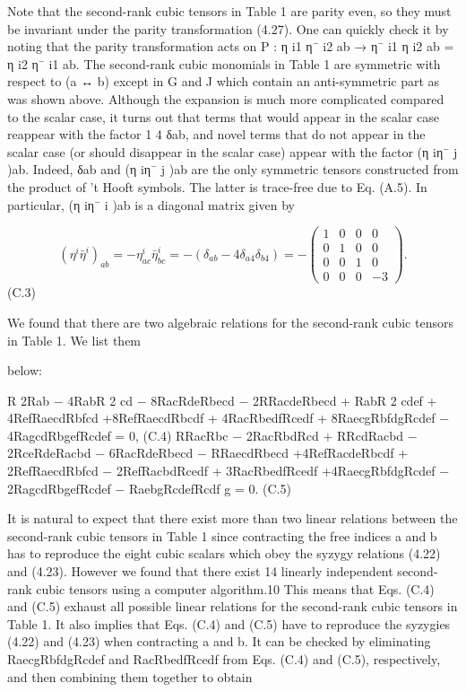 \documentclass{article}
\begin{document}
Note that the second-rank cubic tensors in Table 1 are parity even, so they must be invariant under the parity transformation (4.27). One can quickly check it by noting that the parity transformation acts on P : η i1 η¯ i2 ab → η¯ i1 η i2 ab = η i2 η¯ i1 ab. The second-rank cubic monomials in Table 1 are symmetric with respect to (a ↔ b) except in G and J which contain an anti-symmetric part as was shown above. Although the expansion is much more complicated compared to the scalar case, it turns out that terms that would appear in the scalar case reappear with the factor 1 4 δab, and novel terms that do not appear in the scalar case (or should disappear in the scalar case) appear with the factor (η iη¯ j )ab. Indeed, δab and (η iη¯ j )ab are the only symmetric tensors constructed from the product of 't Hooft symbols. The latter is trace-free due to Eq. (A.5). In particular, (η iη¯ i )ab is a diagonal matrix given by

$$(\eta^{i}\bar{\eta}^{i})_{ab}=-\eta^{i}_{ac}\bar{\eta}^{i}_{bc}=-\left(\delta_{ab}-4\delta_{a4}\delta_{b4}\right)=-\left(\begin{array}{cccc}1&0&0&0\\ 0&1&0&0\\ 0&0&1&0\\ 0&0&0&-3\end{array}\right).$$ (C.3)

We found that there are two algebraic relations for the second-rank cubic tensors in Table 1. We list them

below:

R 2Rab − 4RabR 2 cd − 8RacRdeRbecd − 2RRacdeRbecd + RabR 2 cdef + 4RefRaecdRbfcd +8RefRaecdRbcdf + 4RacRbedfRcedf + 8RaecgRbfdgRcdef − 4RagcdRbgefRcdef = 0, (C.4) RRacRbc − 2RacRbdRcd + RRcdRacbd − 2RceRdeRacbd − 6RacRdeRbecd − RRaecdRbecd +4RefRacdeRbcdf + 2RefRaecdRbfcd − 2RefRacbdRcedf + 3RacRbedfRcedf +4RaecgRbfdgRcdef − 2RagcdRbgefRcdef − RaebgRcdefRcdf g = 0. (C.5)

It is natural to expect that there exist more than two linear relations between the second-rank cubic tensors in Table 1 since contracting the free indices a and b has to reproduce the eight cubic scalars which obey the syzygy relations (4.22) and (4.23). However we found that there exist 14 linearly independent second-rank cubic tensors using a computer algorithm.10 This means that Eqs. (C.4) and (C.5) exhaust all possible linear relations for the second-rank cubic tensors in Table 1. It also implies that Eqs. (C.4) and (C.5) have to reproduce the syzygies (4.22) and (4.23) when contracting a and b. It can be checked by eliminating RaecgRbfdgRcdef and RacRbedfRcedf from Eqs. (C.4) and (C.5), respectively, and then combining them together to obtain
\end{document}
